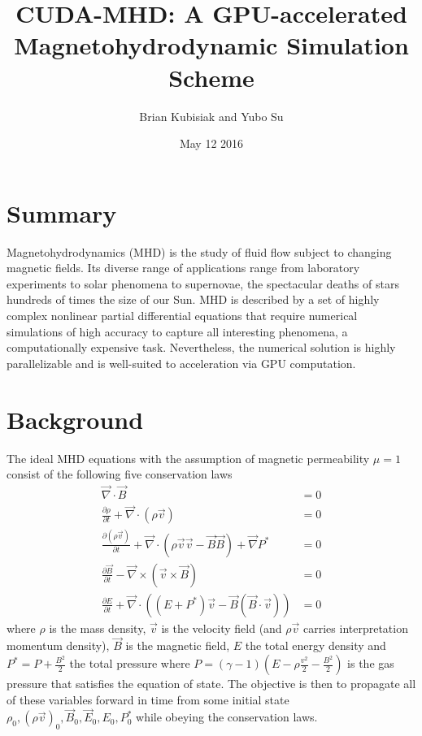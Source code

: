 \documentclass[10pt]{article}
\newcommand{\pd}[2]{\frac{\partial#1}{\partial#2}}
\begin{document}
\pagestyle{fancy}
\cfoot{\thepage/\pageref{LastPage}}

\title{CUDA-MHD: A GPU-accelerated Magnetohydrodynamic Simulation Scheme}
\author{Brian Kubisiak and Yubo Su}
\date{May 12 2016}
\maketitle

\section{Summary}

Magnetohydrodynamics (MHD) is the study of fluid flow subject to changing magnetic fields. Its diverse range of applications range from laboratory experiments to solar phenomena to supernovae, the spectacular deaths of stars hundreds of times the size of our Sun. MHD is described by a set of highly complex nonlinear partial differential equations that require numerical simulations of high accuracy to capture all interesting phenomena, a computationally expensive task. Nevertheless, the numerical solution is highly parallelizable and is well-suited to acceleration via GPU computation.

\section{Background}

The ideal MHD equations with the assumption of magnetic permeability $\mu = 1$ consist of the following five conservation laws
\begin{align}
    \vec{\nabla} \cdot \vec{B} &= 0 \nonumber\\
    \pd{\rho}{t} + \vec{\nabla} \cdot \left( \rho \vec{v} \right) &= 0 \nonumber\\
    \pd{(\rho \vec{v})}{t} + \vec{\nabla} \cdot \left( \rho \vec{v}\vec{v} - \vec{B} \vec{B} \right) + \vec{\nabla}P^* &= 0 \nonumber\\
    \pd{\vec{B}}{t} - \vec{\nabla} \times \left( \vec{v} \times \vec{B} \right) &= 0 \nonumber\\
    \pd{E}{t} + \vec{\nabla} \cdot \left( (E + P^*)\vec{v} - \vec{B}\left( \vec{B} \cdot \vec{v} \right) \right) &= 0
\end{align}
where $\rho$ is the mass density, $\vec{v}$ is the velocity field (and $\rho \vec{v}$ carries interpretation momentum density), $\vec{B}$ is the magnetic field, $E$ the total energy density and $P^* = P + \frac{B^2}{2}$ the total pressure where $P = (\gamma - 1)\left( E - \rho \frac{v^2}{2} - \frac{B^2}{2} \right)$ is the gas pressure that satisfies the equation of state. The objective is then to propagate all of these variables forward in time from some initial state $\rho_0, (\rho \vec{v})_0, \vec{B}_0, \vec{E}_0, E_0, P^*_0$ while obeying the conservation laws.
\end{document}
